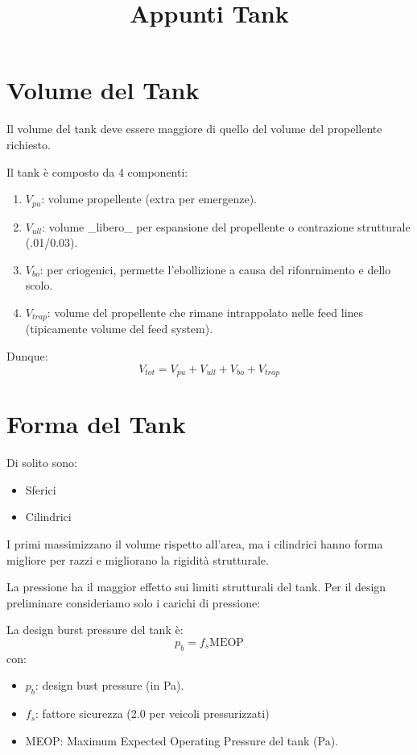 \documentclass[a4paper]{article}
\title{Appunti Tank}
\begin{document}
    \maketitle
    \tableofcontents
    \section{Volume del Tank}
    Il volume del tank deve essere maggiore di 
    quello del volume del propellente richiesto.

    Il tank è composto da 4 componenti:
    \begin{enumerate}
        \item $V_{pu}$: volume propellente (extra per emergenze).
        \item $V_{ull}$: volume _libero_ per espansione del propellente o contrazione strutturale (.01/0.03).
        \item $V_{bo}$: per criogenici, permette l'ebollizione a causa del rifonrnimento e dello scolo.
        \item $V_{trap}$: volume del propellente che rimane intrappolato nelle feed lines (tipicamente volume del feed system).  
    \end{enumerate}
    Dunque: 
    \[V_{tot} = V_{pu} + V_{ull} + V_{bo} + V_{trap}\]
    \section{Forma del Tank}
    Di solito sono: 
    \begin{itemize}
        \item Sferici
        \item Cilindrici
    \end{itemize}
    I primi massimizzano il volume rispetto all'area, ma i cilindrici hanno forma 
    migliore per razzi e migliorano la rigidità strutturale.
    
    La pressione ha il maggior effetto sui limiti strutturali del tank. Per il design
    preliminare consideriamo solo i carichi di pressione:

    La design burst pressure del tank è:
    \[p_b = f_s \text{MEOP}\]
    con: 
    \begin{itemize}
        \item $p_b$: design bust pressure (in Pa).
        \item $f_s$: fattore sicurezza (2.0 per veicoli pressurizzati)
        \item MEOP: Maximum Expected Operating Pressure del tank (Pa).
    \end{itemize}
\end{document}
